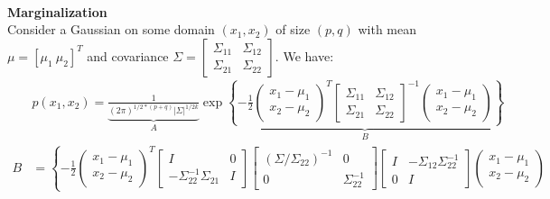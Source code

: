 \documentclass[11pt]{article}
\newcommand{\subsubsubsection}[1]{\noindent\textbf{#1}\\}
\begin{document}
~\\ \subsubsubsection{Marginalization}
Consider a Gaussian on some domain $(x_1, x_2)$ of size $(p,q)$ with mean $\mu = \left[ \mu_1~\mu_2 \right]^T$ and covariance $\Sigma = \left[ \begin{array}{cc} \Sigma_{11} & \Sigma_{12} \\ \Sigma_{21} & \Sigma_{22} \end{array} \right]$. We have:
\begin{align*}
&p(x_1,x_2)=
\underbrace{
\frac{1}{(2\pi)^{1/2*(p+q)}|\Sigma|^{1/2k}}
}_A
\exp
\underbrace{
\left\{
  -\frac{1}{2}
  \left( \begin{array}{c} x_1 - \mu_1 \\ x_2 - \mu_2 \end{array} \right)^{T}
  \left[ \begin{array}{cc} \Sigma_{11} & \Sigma_{12} \\ \Sigma_{21} & \Sigma_{22} \end{array} \right]^{-1}
  \left( \begin{array}{c} x_1 - \mu_1 \\ x_2 - \mu_2 \end{array} \right)
\right\}
}_B \\
B &=
\left\{
  -\frac{1}{2}
  \left( \begin{array}{c} x_1 - \mu_1 \\ x_2 - \mu_2 \end{array} \right)^{T}
  \left[ \begin{array}{cc} I & 0 \\ -\Sigma_{22}^{-1}\Sigma_{21} & I\end{array} \right]
  \left[ \begin{array}{cc} (\Sigma/\Sigma_{22})^{-1} & 0 \\ 0 & \Sigma_{22}^{-1} \end{array} \right]
  \left[ \begin{array}{cc} I & -\Sigma_{12}\Sigma_{22}^{-1} \\ 0 & I\end{array} \right]
  \left( \begin{array}{c} x_1 - \mu_1 \\ x_2 - \mu_2 \end{array} \right)

\end{align*}
\end{document}
